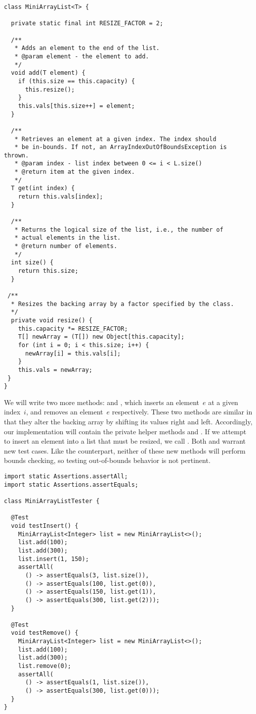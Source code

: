 \enlargethispage{-2\baselineskip}
\begin{lstlisting}[language=MyJava]
class MiniArrayList<T> {

  private static final int RESIZE_FACTOR = 2;

  /**
   * Adds an element to the end of the list.
   * @param element - the element to add.
   */
  void add(T element) {
    if (this.size == this.capacity) { 
      this.resize(); 
    }
    this.vals[this.size++] = element;
  }

  /**
   * Retrieves an element at a given index. The index should
   * be in-bounds. If not, an ArrayIndexOutOfBoundsException is thrown.
   * @param index - list index between 0 <= i < L.size()
   * @return item at the given index.
   */
  T get(int index) { 
    return this.vals[index]; 
  }

  /**
   * Returns the logical size of the list, i.e., the number of 
   * actual elements in the list.
   * @return number of elements.
   */
  int size() { 
    return this.size; 
  }

 /**
  * Resizes the backing array by a factor specified by the class.
  */
  private void resize() {
    this.capacity *= RESIZE_FACTOR;
    T[] newArray = (T[]) new Object[this.capacity];
    for (int i = 0; i < this.size; i++) { 
      newArray[i] = this.vals[i]; 
    }
    this.vals = newArray;
 }
}
\end{lstlisting}

We will write two more methods:  and , which inserts an element~$e$ at a given index~$i$, and removes an element~$e$ respectively. 
These two methods are similar in that they alter the backing array by shifting its values right and left. 
Accordingly, our implementation will contain the private helper methods  and . 
If we attempt to insert an element into a list that must be resized, we call . 
Both  and  warrant new test cases.
Like the  counterpart, neither of these new methods will perform bounds checking, so testing out-of-bounds behavior is not pertinent.

\enlargethispage{-3\baselineskip}
\begin{lstlisting}[language=MyJava]
import static Assertions.assertAll;
import static Assertions.assertEquals;

class MiniArrayListTester {

  @Test
  void testInsert() {
    MiniArrayList<Integer> list = new MiniArrayList<>();
    list.add(100);
    list.add(300);
    list.insert(1, 150);
    assertAll(
      () -> assertEquals(3, list.size()),
      () -> assertEquals(100, list.get(0)),
      () -> assertEquals(150, list.get(1)),
      () -> assertEquals(300, list.get(2)));
  }

  @Test
  void testRemove() {
    MiniArrayList<Integer> list = new MiniArrayList<>();
    list.add(100);
    list.add(300);
    list.remove(0);
    assertAll(
      () -> assertEquals(1, list.size()),
      () -> assertEquals(300, list.get(0)));
  }
}
\end{lstlisting}

